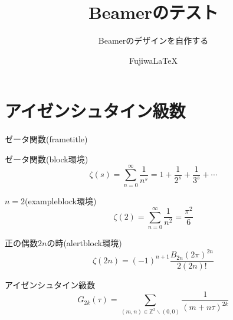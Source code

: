 \documentclass[dvipdfmx]{beamer}
\title{Beamerのテスト}
\subtitle{Beamerのデザインを自作する}
\author{FujiwaLaTeX}
\institute{室蘭工業大学大学院工学研究科 情報電子工学系専攻}
\begin{document}
\maketitle
\section{アイゼンシュタイン級数}
\begin{frame}{ゼータ関数(frametitle)}
  \begin{block}{ゼータ関数(block環境)}
    \begin{equation*}
      \zeta(s) = \sum_{n=0}^{\infty} \frac{1}{n^s} = 1 + \frac{1}{2^s} + \frac{1}{3^s} + \cdots
    \end{equation*}
  \end{block}
  \begin{exampleblock}{$n = 2$(exampleblock環境)}
    \begin{equation*}
      \zeta(2) = \sum_{n=0}^{\infty} \frac{1}{n^2} = \frac{\pi^2}{6}
    \end{equation*}
  \end{exampleblock}
  \begin{alertblock}{正の偶数$2n$の時(alertblock環境)}
    \begin{equation*}
      \zeta(2n) = (-1)^{n+1} \frac{B_{2n}(2\pi)^{2n}}{2(2n)!}
    \end{equation*}
  \end{alertblock}
\end{frame}

\begin{frame}{アイゼンシュタイン級数}
  \begin{equation*}
    G_{2k}(\tau) = \sum_{(m,n) \in \mathbb{Z}^2 \backslash (0,0)}\frac{1}{(m+n\tau)^{2k}}
  \end{equation*}
\end{frame}
\end{document}
